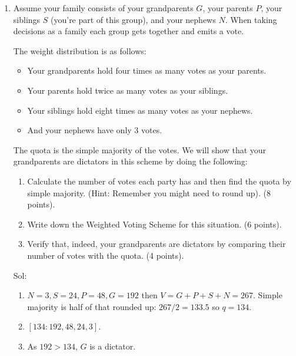 \documentclass[12pt]{exam}
\begin{document}
\begin{enumerate}
\item Assume your family consists of your grandparents $G$, your parents $P$, your siblings $S$ (you're part of this group), and your nephews $N$. When taking decisions as a family each group gets together and emits a vote.\par
The weight distribution is as follows: 
\begin{itemize}
    \item Your grandparents hold four times as many votes as your parents.
    \item Your parents hold twice as many votes as your siblings.
    \item Your siblings hold eight times as many votes as your nephews.
    \item And your nephews have only 3 votes.
\end{itemize}
The quota is the simple majority of the votes. We will show that your grandparents are dictators in this scheme by doing the following:
\begin{enumerate}
    \item Calculate the number of votes each party has and then find the quota by simple majority. (Hint: Remember you might need to round up). (8 points).
    \item Write down the Weighted Voting Scheme for this situation. (6 points).
    \item Verify that, indeed, your grandparents are dictators by comparing their number of votes with the quota. (4 points).
\end{enumerate}

Sol:
\begin{enumerate}
    \item $N=3, S=24, P=48, G=192$ then $V=G+P+S+N=267$. Simple majority is half of that rounded up: $267/2=133.5$ so $q=134$.
    \item $[134:192,48,24,3]$.
    \item As $192>134$, $G$ is a dictator.
\end{enumerate}


\end{enumerate}
\end{document}
